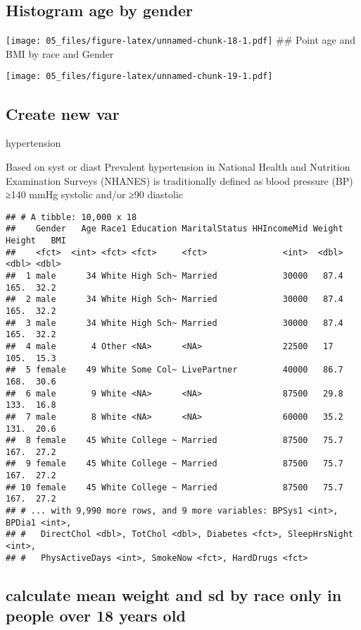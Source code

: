 \documentclass[
]{article}
\begin{document}
\hypertarget{histogram-age-by-gender}{%
\subsection{Histogram age by gender}\label{histogram-age-by-gender}}

\texttt{[image: 05\_files/figure-latex/unnamed-chunk-18-1.pdf]} \#\#
Point age and BMI by race and Gender

\texttt{[image: 05\_files/figure-latex/unnamed-chunk-19-1.pdf]}

\hypertarget{create-new-var}{%
\subsection{Create new var}\label{create-new-var}}

hypertension

Based on syst or diast Prevalent hypertension in National Health and
Nutrition Examination Surveys (NHANES) is traditionally defined as blood
pressure (BP) ≥140 mmHg systolic and/or ≥90 diastolic

\begin{verbatim}
## # A tibble: 10,000 x 18
##    Gender   Age Race1 Education MaritalStatus HHIncomeMid Weight Height   BMI
##    <fct>  <int> <fct> <fct>     <fct>               <int>  <dbl>  <dbl> <dbl>
##  1 male      34 White High Sch~ Married             30000   87.4   165.  32.2
##  2 male      34 White High Sch~ Married             30000   87.4   165.  32.2
##  3 male      34 White High Sch~ Married             30000   87.4   165.  32.2
##  4 male       4 Other <NA>      <NA>                22500   17     105.  15.3
##  5 female    49 White Some Col~ LivePartner         40000   86.7   168.  30.6
##  6 male       9 White <NA>      <NA>                87500   29.8   133.  16.8
##  7 male       8 White <NA>      <NA>                60000   35.2   131.  20.6
##  8 female    45 White College ~ Married             87500   75.7   167.  27.2
##  9 female    45 White College ~ Married             87500   75.7   167.  27.2
## 10 female    45 White College ~ Married             87500   75.7   167.  27.2
## # ... with 9,990 more rows, and 9 more variables: BPSys1 <int>, BPDia1 <int>,
## #   DirectChol <dbl>, TotChol <dbl>, Diabetes <fct>, SleepHrsNight <int>,
## #   PhysActiveDays <int>, SmokeNow <fct>, HardDrugs <fct>
\end{verbatim}

\hypertarget{calculate-mean-weight-and-sd-by-race-only-in-people-over-18-years-old}{%
\subsection{calculate mean weight and sd by race only in people over 18
years
old}\label{calculate-mean-weight-and-sd-by-race-only-in-people-over-18-years-old}}
\end{document}
